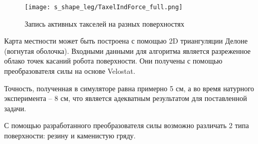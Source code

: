 \begin{figure}[H]
    \centering\texttt{[image: s\_shape\_leg/TaxelIndForce\_full.png]}
    \caption{Запись активных такселей на разных поверхностях}
    \label{fig:s_shape_leg/TaxelIndForce_full.png}
\end{figure}

Карта местности может быть построена с помощью 2D триангуляции Делоне (вогнутая оболочка). Входными данными для алгоритма является разреженное облако точек касаний робота поверхности. Они получены с помощью преобразователя силы на основе Velostat.

Точность, полученная в симуляторе равна примерно 5 см, а во время натурного эксперимента -- 8 см, что является адекватным результатом для поставленной задачи.

С помощью разработанного преобразователя силы возможно различать 2 типа поверхности: резину и каменистую гряду.